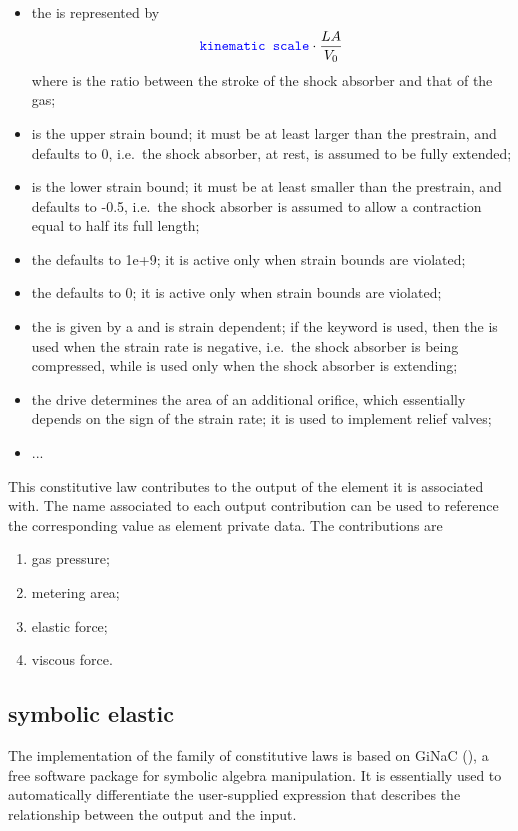 \begin{itemize}
\item the  is represented by
\begin{displaymath}
	\textcolor{blue}{\texttt{kinematic scale}} \cdot \frac{L A}{V_0}
\end{displaymath}
where  is the ratio between the stroke
of the shock absorber and that of the gas;
\item {} is the upper strain bound; it must be
at least larger than the prestrain, and defaults to 0,
i.e.\ the shock absorber, at rest, is assumed to be fully
extended;
\item {} is the lower strain bound; it must be
at least smaller than the prestrain, and defaults to -0.5, 
i.e.\ the shock absorber is assumed to allow a contraction
equal to half its full length;
\item the  defaults to 1e+9;
it is active only when strain bounds are violated;
\item the  defaults to 0;
it is active only when strain bounds are violated;
\item the  is given by a  
and is strain dependent; if the keyword  is used, 
then the  is used
when the strain rate is negative, i.e.\ the shock absorber
is being compressed, while  is used only
when the shock absorber is extending;
\item the  drive determines the area of an
additional orifice, which essentially depends on the sign
of the strain rate; it is used to implement relief valves;
\item ...
\end{itemize}
This constitutive law contributes to the output of the element
it is associated with.
The name associated to each output contribution can be used to reference
the corresponding value as element private data.
The contributions are
\begin{enumerate}
\item {} gas pressure;
\item {} metering area;
\item {} elastic force;
\item {} viscous force.
\end{enumerate}

\subsection{symbolic elastic}\label{sec:CL:SYMBOLIC-ELASTIC}
The implementation  of the family of  constitutive laws
is based on GiNaC 
(),
a free software package for symbolic algebra manipulation.
It is essentially used to automatically differentiate
the user-supplied expression that describes the relationship
between the output and the input.

